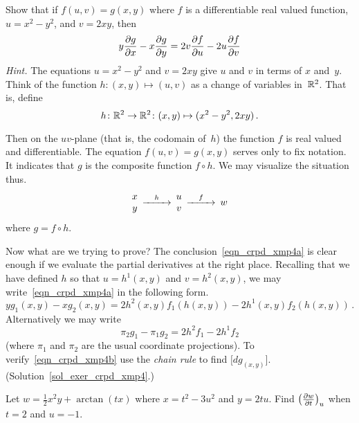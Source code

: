 \begin{exer}\label{exer_crpd_xmp4}  Show that if $f(u,v) = g(x,y)$ where $f$ is a differentiable
real valued function, $u = x^2 - y^2$, and $v = 2xy$, then
  \begin{equation}\label{eqn_crpd_xmp4a}
      y \frac{\partial g}{\partial x} - x \frac{\partial g}{\partial y} = 2v \frac{\partial f}{\partial u} - 2u \frac{\partial f}{\partial v}
  \end{equation}
\emph{Hint.}  The equations $u = x^2 - y^2$ and $v = 2xy$ give $u$ and $v$ in terms of $x$
and~$y$.  Think of the function $h\colon (x,y) \mapsto (u,v)$ as a change of variables
in~$\mathbb{R}^2$.  That is, define
  \[ h \colon \mathbb{R}^2 \rightarrow \mathbb{R}^2 \colon (x,y) \mapsto (x^2 - y^2, 2xy)\,. \]

Then on the $uv$-plane (that is, the codomain of~$h$) the function $f$ is real valued and
differentiable.  The equation $f(u,v) = g(x,y)$ serves only to fix notation.  It indicates
that $g$ is the composite function $f \circ h$.  We may visualize the situation thus.
 \begin{equation}
  \begin{CD}
   \begin{matrix} x \\ y \end{matrix}  @>h>>
   \begin{matrix} u \\ v \end{matrix} @>f>> w
  \end{CD}
 \end{equation}
where $g = f \circ h$.

Now what are we trying to prove?  The conclusion~\eqref{eqn_crpd_xmp4a} is clear enough if we
evaluate the partial derivatives at the right place.  Recalling that we have defined $h$ so
that $u = h^1(x,y)$ and $v = h^2(x,y)$, we may write~\eqref{eqn_crpd_xmp4a} in the following
form.
  \begin{equation}\label{eqn_crpd_xmp4b}
      y g_1(x,y) - x g_2(x,y) = 2h^2(x,y)f_1(h(x,y)) - 2h^1(x,y)f_2(h(x,y))\,.
  \end{equation}
Alternatively we may write
  \[ \pi_2 g_1 - \pi_1 g_2 = 2 h^2f_1 - 2h^1f_2 \]
(where $\pi_1$ and $\pi_2$ are the usual coordinate projections).  To
verify~\eqref{eqn_crpd_xmp4b} use the \emph{chain rule} to find $\bigl[dg_{(x,y)}\bigr]$.
(Solution~\ref{sol_exer_crpd_xmp4}.)
\end{exer}

\begin{prob}  Let $w = \frac12x^2y + \arctan(tx)$ where $x = t^2 - 3u^2$ and $y = 2tu$.  Find
$\left(\frac{\partial w}{\partial t}\right)_{u}$ when $t = 2$ and $u = -1$.
\end{prob}

